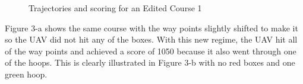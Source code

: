 \documentclass[12pt]{article}
\begin{document}
\begin{figure}[H]
	\caption{Trajectories and scoring for an Edited Course 1}
\end{figure}
Figure 3-a shows the same course with the way points slightly shifted to make it so the UAV did not hit any of the boxes. With this new regime, the UAV hit all of the way points and achieved a score of 1050 because it also went through one of the hoops. This is clearly illustrated in Figure 3-b with no red boxes and one green hoop. 
\end{document}
